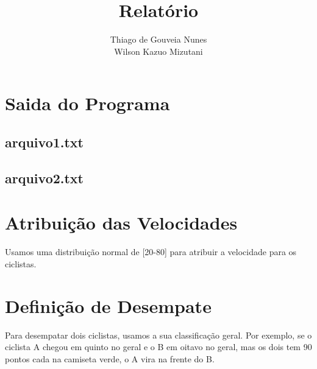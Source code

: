 \documentclass[a4paper,11pt]{article}
\title{Relatório}
\author{Thiago de Gouveia Nunes \\ Wilson Kazuo Mizutani}
\begin{document}
\maketitle
\tableofcontents

\section{Saida do Programa}
\subsection{arquivo1.txt}
\subsection{arquivo2.txt}
\section{Atribuição das Velocidades}
  Usamos uma distribuição normal de [20-80] para atribuir a velocidade para os ciclistas.
\section{Definição de Desempate}
  Para desempatar dois ciclistas, usamos a sua classificação geral. 
  Por exemplo, se o ciclista A chegou em quinto no geral e o B em oitavo no geral, mas os dois tem 90 pontos cada na camiseta verde, o A vira na frente do B.
\end{document}
